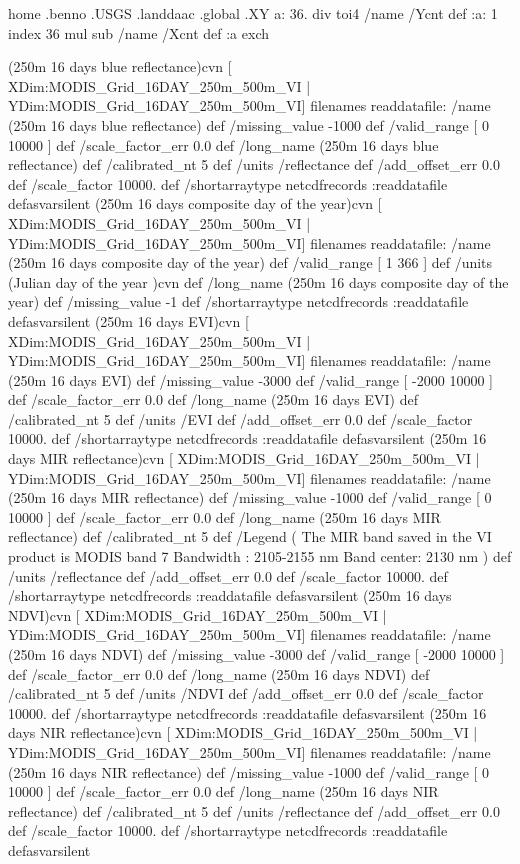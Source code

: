 home .benno .USGS .landdaac .global .XY
  a:
    36. div
    toi4
    /name /Ycnt def
    :a: 1 index
      36 mul
      sub
     /name /Xcnt def
     :a
   exch


(250m 16 days blue reflectance)cvn{
[ XDim:MODIS_Grid_16DAY_250m_500m_VI | YDim:MODIS_Grid_16DAY_250m_500m_VI] filenames readdatafile:
/name (250m 16 days blue reflectance) def
 /missing_value -1000 def
 /valid_range [ 0 10000 ] def
 /scale_factor_err 0.0 def
 /long_name (250m 16 days blue reflectance) def
 /calibrated_nt 5 def
 /units /reflectance def
 /add_offset_err 0.0 def
 /scale_factor 10000. def
 /shortarraytype netcdfrecords :readdatafile
}defasvarsilent
 (250m 16 days composite day of the year)cvn{
[ XDim:MODIS_Grid_16DAY_250m_500m_VI | YDim:MODIS_Grid_16DAY_250m_500m_VI] filenames readdatafile:
/name (250m 16 days composite day of the year) def
 /valid_range [ 1 366 ] def
 /units (Julian day of the year )cvn def
 /long_name (250m 16 days composite day of the year) def
 /missing_value -1 def
 /shortarraytype netcdfrecords :readdatafile
}defasvarsilent
 (250m 16 days EVI)cvn{
[ XDim:MODIS_Grid_16DAY_250m_500m_VI | YDim:MODIS_Grid_16DAY_250m_500m_VI] filenames readdatafile:
/name (250m 16 days EVI) def
 /missing_value -3000 def
 /valid_range [ -2000 10000 ] def
 /scale_factor_err 0.0 def
 /long_name (250m 16 days EVI) def
 /calibrated_nt 5 def
 /units /EVI def
 /add_offset_err 0.0 def
 /scale_factor 10000. def
 /shortarraytype netcdfrecords :readdatafile
}defasvarsilent
 (250m 16 days MIR reflectance)cvn{
[ XDim:MODIS_Grid_16DAY_250m_500m_VI | YDim:MODIS_Grid_16DAY_250m_500m_VI] filenames readdatafile:
/name (250m 16 days MIR reflectance) def
 /missing_value -1000 def
 /valid_range [ 0 10000 ] def
 /scale_factor_err 0.0 def
 /long_name (250m 16 days MIR reflectance) def
 /calibrated_nt 5 def
 /Legend (
	 The MIR band saved in the VI product is MODIS band 7 
		 Bandwidth : 2105-2155 nm 
		 Band center: 2130 nm 
) def
 /units /reflectance def
 /add_offset_err 0.0 def
 /scale_factor 10000. def
 /shortarraytype netcdfrecords :readdatafile
}defasvarsilent
 (250m 16 days NDVI)cvn{
[ XDim:MODIS_Grid_16DAY_250m_500m_VI | YDim:MODIS_Grid_16DAY_250m_500m_VI] filenames readdatafile:
/name (250m 16 days NDVI) def
 /missing_value -3000 def
 /valid_range [ -2000 10000 ] def
 /scale_factor_err 0.0 def
 /long_name (250m 16 days NDVI) def
 /calibrated_nt 5 def
 /units /NDVI def
 /add_offset_err 0.0 def
 /scale_factor 10000. def
 /shortarraytype netcdfrecords :readdatafile
}defasvarsilent
 (250m 16 days NIR reflectance)cvn{
[ XDim:MODIS_Grid_16DAY_250m_500m_VI | YDim:MODIS_Grid_16DAY_250m_500m_VI] filenames readdatafile:
/name (250m 16 days NIR reflectance) def
 /missing_value -1000 def
 /valid_range [ 0 10000 ] def
 /scale_factor_err 0.0 def
 /long_name (250m 16 days NIR reflectance) def
 /calibrated_nt 5 def
 /units /reflectance def
 /add_offset_err 0.0 def
 /scale_factor 10000. def
 /shortarraytype netcdfrecords :readdatafile
}defasvarsilent
